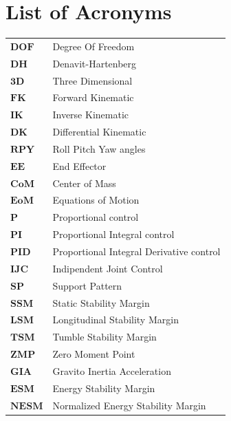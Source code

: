 \chapter*{List of Acronyms} %
\begin{table}[H]
    \begin{tabular}{ll}
        $\bm{DOF}$ & Degree Of Freedom \\[2pt]
        $\bm{DH}$ & Denavit-Hartenberg \\[2pt]
        $\bm{3D}$ & Three Dimensional \\[2pt]
        $\bm{FK}$ & Forward Kinematic \\[2pt]
        $\bm{IK}$ & Inverse Kinematic \\[2pt]
        $\bm{DK}$ & Differential Kinematic \\[2pt]
        $\bm{RPY}$ & Roll Pitch Yaw angles \\[2pt]
        $\bm{EE}$ & End Effector\\[2pt]
        $\bm{CoM}$ & Center of Mass\\[2pt]
        $\bm{EoM}$ & Equations of Motion\\[2pt]
        $\bm{P}$ & Proportional control\\[2pt]
        $\bm{PI}$ & Proportional Integral control\\[2pt]
        $\bm{PID}$ & Proportional Integral Derivative control\\[2pt]
        $\bm{IJC}$ & Indipendent Joint Control\\[2pt]
        $\bm{SP}$ & Support Pattern \\[2pt]
        $\bm{SSM}$ & Static Stability Margin\\[2pt]
        $\bm{LSM}$ & Longitudinal Stability Margin\\[2pt]
        $\bm{TSM}$ & Tumble Stability Margin\\[2pt]
        $\bm{ZMP}$ & Zero Moment Point\\[2pt]
        $\bm{GIA}$ & Gravito Inertia Acceleration\\[2pt]
        $\bm{ESM}$ & Energy Stability Margin\\[2pt]
        $\bm{NESM}$ & Normalized Energy Stability Margin\\[2pt]

\end{tabular}
\end{table}
